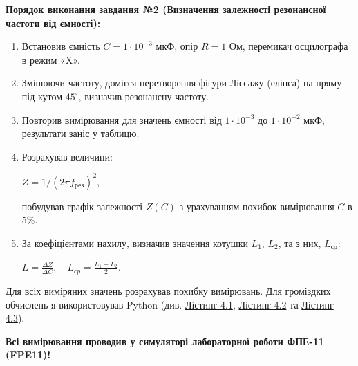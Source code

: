 \documentclass[12pt, a4paper]{article}
\begin{document}
    \textbf{Порядок виконання завдання №2 (Визначення залежності резонансної частоти від ємності):}

    \begin{enumerate}

        \item Встановив ємність $C = 1\cdot10^{-3}$ мкФ, опір $R = 1$ Ом, перемикач осцилографа в режим «X».
    
        \item Змінюючи частоту, домігся перетворення фігури Ліссажу (еліпса) на пряму під кутом $45^{\circ}$, визначив резонансну частоту.
    
        \item Повторив вимірювання для значень ємності від $1\cdot10^{-3}$ до $1\cdot10^{-2}$ мкФ, результати заніс у таблицю.
    
        \item Розрахував величини:

        \vspace{-0.5em}

        \begin{center}
            $\displaystyle Z = 1/(2\pi f_{\text{рез}})^2$,
        \end{center}

        \vspace{-0.5em}

        побудував графік залежності $Z(C)$ з урахуванням похибок вимірювання $C$ в 5\%.
    
        \item За коефіцієнтами нахилу, визначив значення котушки $L_1$, $L_2$, та з них, $L_{\text{ср}}$:

        \begin{center}
            $\displaystyle L = \frac{\Delta Z}{\Delta C}, \quad L_{cp} = \frac{L_1 + L_2}{2}$.
        \end{center}

    \end{enumerate}

    Для всіх виміряних значень розрахував похибку вимірювань. Для громіздких обчислень я використовував Python
    (див. \hyperlink{listing1}{Лістинг 4.1}, \hyperlink{listing2}{Лістинг 4.2} та \hyperlink{listing3}{Лістинг 4.3}).

    \textbf{Всі вимірювання проводив у симуляторі лабораторної роботи ФПЕ-11 (FPE11)!}
\end{document}
